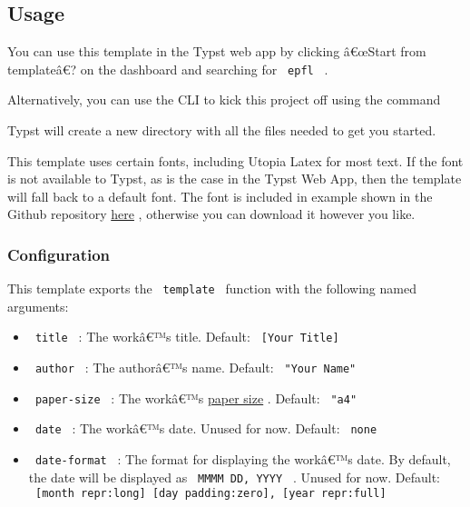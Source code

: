 \subsection{Usage}\label{usage}

You can use this template in the Typst web app by clicking â€œStart from
templateâ€? on the dashboard and searching for \texttt{\ epfl\ } .

Alternatively, you can use the CLI to kick this project off using the
command

\begin{Shaded}
\begin{Highlighting}[]
\end{Highlighting}
\end{Shaded}

Typst will create a new directory with all the files needed to get you
started.

This template uses certain fonts, including Utopia Latex for most text.
If the font is not available to Typst, as is the case in the Typst Web
App, then the template will fall back to a default font. The font is
included in example shown in the Github repository
\href{https://github.com/augustebaum/epfl-thesis-typst/blob/v0.1.2/example/utopia_font}{here}
, otherwise you can download it however you like.

\subsubsection{Configuration}\label{configuration}

This template exports the \texttt{\ template\ } function with the
following named arguments:

\begin{itemize}
\tightlist
\item
  \texttt{\ title\ } : The workâ€™s title. Default:
  \texttt{\ {[}Your\ Title{]}\ }
\item
  \texttt{\ author\ } : The authorâ€™s name. Default:
  \texttt{\ "Your\ Name"\ }
\item
  \texttt{\ paper-size\ } : The workâ€™s
  \href{https://typst.app/docs/reference/layout/page\#parameters-paper}{paper
  size} . Default: \texttt{\ "a4"\ }
\item
  \texttt{\ date\ } : The workâ€™s date. Unused for now. Default:
  \texttt{\ none\ }
\item
  \texttt{\ date-format\ } : The format for displaying the workâ€™s
  date. By default, the date will be displayed as
  \texttt{\ MMMM\ DD,\ YYYY\ } . Unused for now. Default:
  \texttt{\ {[}month\ repr:long{]}\ {[}day\ padding:zero{]},\ {[}year\ repr:full{]}\ }
\end{itemize}

